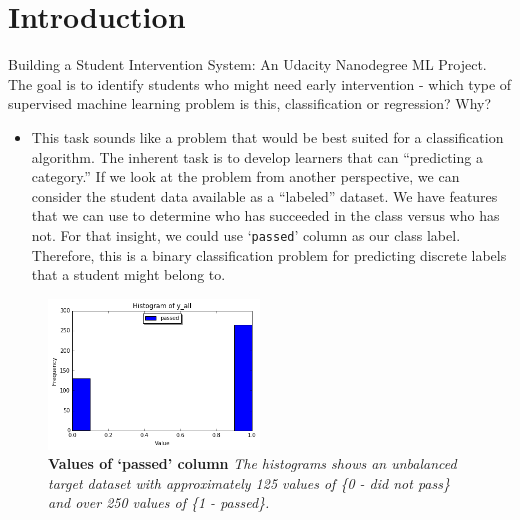 \documentclass[twoside,openright,titlepage,numbers=noenddot,headinclude,%
               footinclude=true,cleardoublepage=empty,abstractoff,BCOR=5mm,%
               paper=a4,fontsize=11pt,ngerman,american]{scrreprt}
\numberwithin{theorem}{chapter}
\numberwithin{definition}{chapter}
\numberwithin{algorithm}{chapter}
\numberwithin{figure}{chapter}
\numberwithin{table}{chapter}
\numberwithin{equation}{chapter}
\begin{document}
\raggedbottom
{}
\pagestyle{plain}









\chapter*{Introduction}
Building a Student Intervention System: An Udacity Nanodegree ML Project. The goal is to identify students who might need early intervention - which type of supervised machine learning problem is this, classification or regression? Why?

\begin{itemize}%
\item 
This task sounds like a problem that would be best suited for a classification algorithm. The inherent task is to develop learners that can ``predicting a category.'' If we look at the problem from another perspective, we can consider the student data available as a ``labeled'' dataset. We have features that we can use to determine who has succeeded in the class versus who has not. For that insight, we could use `\texttt{passed}' column as our class label. Therefore, this is a binary classification problem for predicting discrete labels that a student might belong to.
\end{itemize}

\begin{figure}[!htbp]
  \centering
    \includegraphics[width=0.5\textwidth]{images/y_all}
\caption{\textbf{Values of `passed' column} \textit{The histograms shows an unbalanced target dataset with approximately 125 values of \{0 - did not pass\} and over 250 values of \{1 - passed\}.}}
\label{y_all}
\end{figure}
\end{document}
